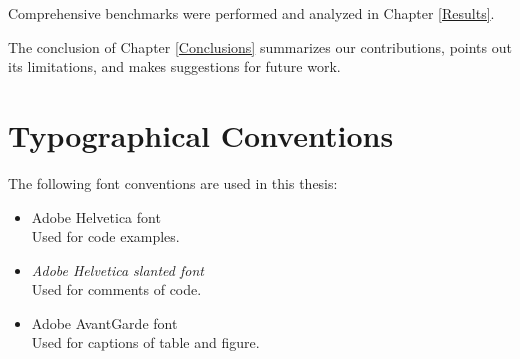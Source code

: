 Comprehensive benchmarks were performed and analyzed in Chapter \ref{Results}. 

The conclusion of Chapter \ref{Conclusions} summarizes our contributions, points out its limitations, and makes suggestions for future work.

\section{Typographical Conventions}
The following font conventions are used in this thesis:
\begin{itemize}
 \item {\selectfont Adobe Helvetica font}\\
 Used for code examples.
 \item {\selectfont \textsl{Adobe Helvetica slanted font}}\\
 Used for comments of code.
 \item {\selectfont Adobe AvantGarde font}\\
 Used for captions of table and figure.
\end{itemize}

